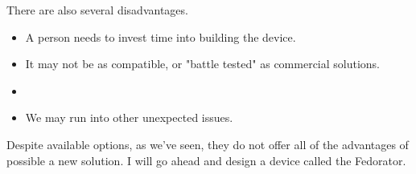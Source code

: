         There are also several disadvantages. 
        \begin{itemize}
            \item A person needs to invest time into building the device.
            \item It may not be as compatible, or "battle tested" as commercial solutions.
            \item {}
            \item We may run into other unexpected issues.
        \end{itemize}
        
        Despite available options, as we've seen, they do not offer all of the advantages of possible a new solution.  I will go ahead and design a device called the Fedorator.
